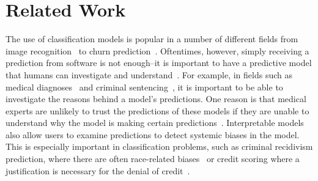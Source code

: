 
\chapter{Related Work}

The use of classification models is popular in a number of different fields from image recognition~\cite{LeCunBoBeHa98} to churn prediction~\cite{LemmensCr06}.
Oftentimes, however, simply receiving a prediction from software is not enough--it is important to have a predictive model that humans can investigate and understand~\cite{Bratko97, Quinlan99, Ruping06, MartensVaVeBa11, Freitas14}.
For example, in fields such as medical diagnoses~\cite{BellazziZu08} and criminal sentencing~\cite{LarsonMaKiAn16}, it is important to be able to investigate the reasons behind a model's predictions.
One reason is that medical experts are unlikely to trust the predictions of these models if they are unable to understand why the model is making certain predictions~\cite{Lavrač99}.
Interpretable models also allow users to examine predictions to detect systemic biases in the model.
This is especially important in classification problems, such as criminal recidivism prediction, where there are often race-related biases~\cite{LarsonMaKiAn16} or credit scoring where a justification is necessary for the denial of credit~\cite{BaesensMuDeVaSe05}.

